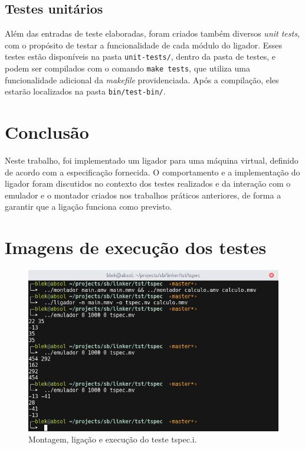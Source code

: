 \documentclass[12pt,a4paper]{article}
\numberwithin{equation}{section}
\begin{document}
\subsection{Testes unitários}

Além das entradas de teste elaboradas, foram criados também diversos \emph{unit tests}, com o propósito de testar a funcionalidade de cada módulo do ligador. Esses testes estão disponíveis na pasta \verb|unit-tests/|, dentro da pasta de testes, e podem ser compilados com o comando \verb|make tests|, que utiliza uma funcionalidade adicional da \emph{makefile} providenciada. Após a compilação, eles estarão localizados na pasta \verb|bin/test-bin/|.

\section{Conclusão}

Neste trabalho, foi implementado um ligador para uma máquina virtual, definido de acordo com a especificação fornecida. O comportamento e a implementação do ligador foram discutidos no contexto dos testes realizados e da interação com o emulador e o montador criados nos trabalhos práticos anteriores, de forma a garantir que a ligação funciona como previsto.

\appendix

\section{Imagens de execução dos testes}

\begin{figure}[h]
    \includegraphics[scale=0.6]{imagens/tspec.png}
    \centering
    \caption{Montagem, ligação e execução do teste tspec.i.}
\end{figure}
\end{document}

